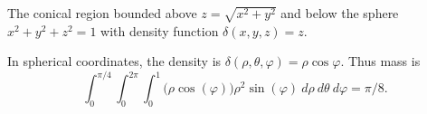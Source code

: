 {
The conical region bounded above $z=\sqrt{x^2+y^2}$ and below the sphere $x^2+y^2+z^2=1$ with density function $\delta(x,y,z) = z$.
}
{In spherical coordinates, the density is $\delta(\rho,\theta,\varphi) = \rho\cos\varphi$. Thus mass is
$$\int_0^{\pi/4}\int_0^{2\pi}\int_{0}^{1} \big(\rho\cos(\varphi)\big)\rho^2\sin(\varphi)\ d\rho\ d\theta\ d\varphi = \pi/8.$$

}
